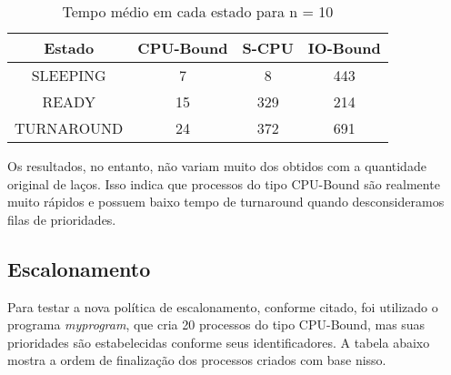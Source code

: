 \documentclass{article}
\begin{document}
\begin{table}[H]
      \centering
      \begin{tabular}{|c|c|c|c|}
            \hline
            Estado     & CPU-Bound & S-CPU &
            IO-Bound                             \\
            \hline
            SLEEPING   & 7         & 8     & 443 \\
            READY      & 15        & 329   & 214 \\
            TURNAROUND & 24        & 372   & 691 \\
            \hline
      \end{tabular}
      \caption{Tempo médio em cada estado para n = 10}
\end{table}

Os resultados, no entanto, não variam muito dos obtidos com a quantidade
original de laços. Isso indica que processos do tipo CPU-Bound são realmente
muito rápidos e possuem baixo tempo de turnaround quando desconsideramos filas
de prioridades.

\subsection{Escalonamento}

Para testar a nova política de escalonamento, conforme citado, foi utilizado o
programa \textit{myprogram}, que cria 20 processos do tipo
CPU-Bound, mas suas prioridades são estabelecidas conforme seus
identificadores. A tabela abaixo mostra a ordem de finalização dos processos
criados com base nisso.
\end{document}

